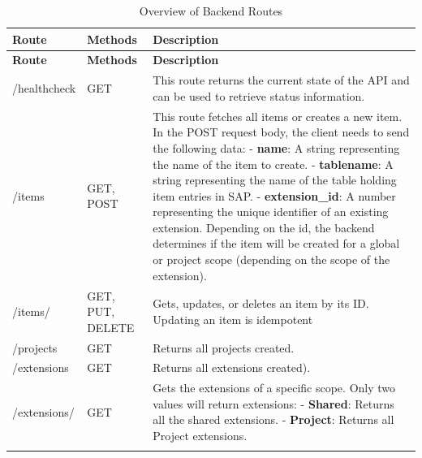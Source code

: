 \begin{longtable}{|l|p{3cm}|>{\raggedright\arraybackslash}p{7cm}|}
    \hline
    \rowcolor{headercolor} \textbf{Route} & \textbf{Methods} & \textbf{Description} \\
    \endfirsthead

    \hline
    \rowcolor{headercolor} \textbf{Route} & \textbf{Methods} & \textbf{Description} \\
    \endhead

    \hline
    /healthcheck & GET & This route returns the current state of the API and can be used to retrieve status information. \\
    \hline
    /items & GET, POST & This route fetches all items or creates a new item.
    In the POST request body, the client needs to send the following data:
    \newline\newline  - \textbf{name}: A string representing the name of the item to create.
    \newline\newline - \textbf{tablename}: A string representing the name of the table holding item entries in SAP.
    \newline\newline - \textbf{extension\_id}: A number representing the unique identifier of an existing extension. Depending on the id, the backend determines if the item will be created for a global or project scope (depending on the scope of the extension). \\
    \hline
    /items/ & GET, PUT, DELETE & Gets, updates, or deletes an item by its ID. Updating an item is idempotent \\
    \hline
    /projects & GET & Returns all projects created. \\
    \hline
    /extensions & GET & Returns all extensions created). \\
    \hline
    /extensions/ & GET & Gets the extensions of a specific scope.
    Only two values will return extensions:
    \newline\newline - \textbf{Shared}: Returns all the shared extensions.
    \newline\newline - \textbf{Project}: Returns all Project extensions. \\
    \hline
    \caption{Overview of Backend Routes}
    \label{tab:table_routes}
\end{longtable}


